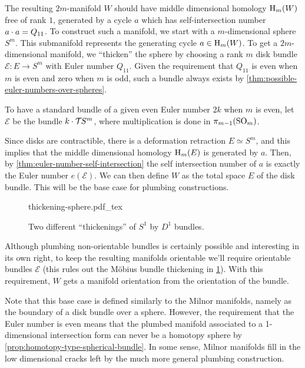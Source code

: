 The resulting $2m$-manifold $W$ should have middle dimensional homology $\operatorname{H}_m(W)$ free of rank $1$, generated by a cycle $a$ which has self-intersection number $a \cdot a= Q_{11}$. To construct such a manifold, we start with a $m$-dimensional sphere $S^m$. This submanifold represents the generating cycle $a\in \operatorname{H}_m(W)$.
To get a $2m$-dimensional manifold, we ``thicken'' the sphere by choosing a rank $m$ disk bundle $\mathcal{E} : E \to S^m$ with Euler number $Q_{11}$. Given the requirement that $Q_{11}$ is even when $m$ is even and zero when $m$ is odd, such a bundle always exists by \cref{thm:possible-euler-numbers-over-spheres}.
\begin{remark}
	To have a standard bundle of a given even Euler number $2k$ when $m$ is even, let $\mathcal{E}$ be the bundle $k\cdot {\mathcal{T}\hspace{-0.1em}} S^m$, where multiplication is done in $\pi_{m-1}(\mathrm{SO}_m)$.
\end{remark}
Since disks are contractible, there is a deformation retraction $E\simeq S^m$, and this implies that the middle dimensional homology $\operatorname{H}_m(E)$ is generated by $a$.
Then, by \cref{thm:euler-number-self-intersection} the self intersection number of $a$ is exactly the Euler number $e(\mathcal{E})$.
We can then define $W$ as the total space $E$ of the disk bundle. This will be the base case for plumbing constructions.
\begin{figure}[ht]
	\centering
	{thickening-sphere.pdf_tex}
	\caption{Two different ``thickenings'' of $S^1$ by $D^1$ bundles.}\label{fig:thickening-sphere}
\end{figure}
\begin{remark}
	Although plumbing non-orientable bundles is certainly possible and interesting in its own right, to keep the resulting manifolds orientable we'll require orientable bundles $\mathcal{E}$ (this rules out the M\"obius bundle thickening in \cref{fig:thickening-sphere}). With this requirement, $W$ gets a manifold orientation from the orientation of the bundle.
\end{remark}

\begin{remark}
	Note that this base case is defined similarly to the Milnor manifolds, namely as the boundary of a disk bundle over a sphere. However, the requirement that the Euler number is even means that the plumbed manifold associated to a 1-dimensional intersection form can never be a homotopy sphere by \cref{prop:homotopy-type-spherical-bundle}. In some sense, Milnor manifolds fill in the low dimensional cracks left by the much more general plumbing construction.
\end{remark}
